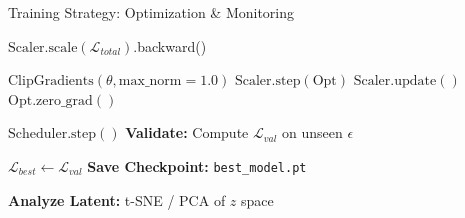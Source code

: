 \documentclass[aspectratio=169, 10pt]{beamer}
\begin{document}
\begin{frame}[fragile]{Training Strategy: Optimization \& Monitoring}
    \centering
    \begin{algorithm}[H]
        \caption*{Physics-Informed Training Loop (Optimization)}
        \begin{algorithmic}[1]
            
                    \State $\text{Scaler}.\text{scale}(\mathcal{L}_{total})$.backward()
                    
                        \State $\text{ClipGradients}(\theta, \text{max\_norm}=1.0)$
                        \State $\text{Scaler}.\text{step}(\text{Opt})$
                        \State $\text{Scaler}.\text{update}()$
                        \State $\text{Opt}.\text{zero\_grad}()$
                    \EndIf
                \EndFor
                
                \State $\text{Scheduler}.\text{step}()$
                \State \textbf{Validate:} Compute $\mathcal{L}_{val}$ on unseen $\epsilon$
                
                    \State $\mathcal{L}_{best} \leftarrow \mathcal{L}_{val}$
                    \State \textbf{Save Checkpoint:} \texttt{best\_model.pt}
                \EndIf
                
                    \State \textbf{Analyze Latent:} t-SNE / PCA of $z$ space
                \EndIf
                
            \EndFor
        \end{algorithmic}
    \end{algorithm}
\end{frame}
\end{document}
